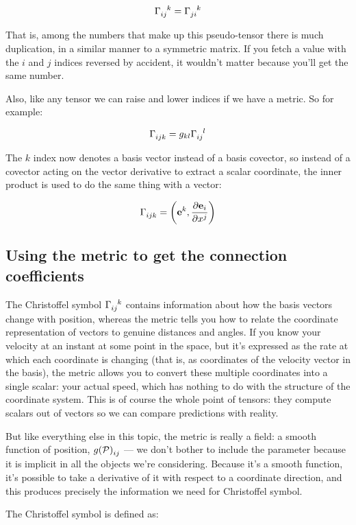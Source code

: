 $$
\Gamma\indices{_i_j^k} = \Gamma\indices{_j_i^k}
$$

That is, among the numbers that make up this pseudo-tensor there is much duplication, in a similar manner to a symmetric matrix. If you fetch a value with the $i$ and $j$ indices reversed by accident, it wouldn't matter because you'll get the same number.

Also, like any tensor we can raise and lower indices if we have a metric. So for example:

$$
\Gamma\indices{_i_j_k} 
= 
g_{kl}
\Gamma\indices{_i_j^l}
$$

The $k$ index now denotes a basis vector instead of a basis covector, so instead of a covector acting on the vector derivative to extract a scalar coordinate, the inner product is used to do the same thing with a vector:

$$
\Gamma\indices{_i_j_k} = \left( \vec{e}^k , \frac{\partial \vec{e}_i}{\partial x^j} \right)
$$

\subsection{Using the metric to get the connection coefficients}

The Christoffel symbol $\Gamma\indices{_i_j^k}$ contains information about how the basis vectors change with position, whereas the metric tells you how to relate the coordinate representation of vectors to genuine distances and angles. If you know your velocity at an instant at some point in the space, but it's expressed as the rate at which each coordinate is changing (that is, as coordinates of the velocity vector in the basis), the metric allows you to convert these multiple coordinates into a single scalar: your actual speed, which has nothing to do with the structure of the coordinate system. This is of course the whole point of tensors: they compute scalars out of vectors so we can compare predictions with reality.

But like everything else in this topic, the metric is really a field: a smooth function of position, $g(\mathcal{P})\indices{_i_j}$ --- we don't bother to include the parameter because it is implicit in all the objects we're considering. Because it's a smooth function, it's possible to take a derivative of it with respect to a coordinate direction, and this produces precisely the information we need for Christoffel symbol.

The Christoffel symbol is defined as:

